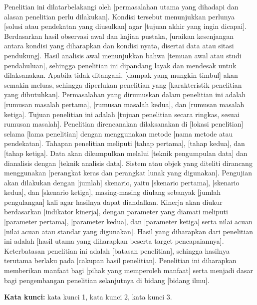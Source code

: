 \begin{abstrak}
Penelitian ini dilatarbelakangi oleh [permasalahan utama yang dihadapi dan alasan penelitian perlu dilakukan]. Kondisi tersebut menunjukkan perlunya [solusi atau pendekatan yang diusulkan] agar [tujuan akhir yang ingin dicapai]. Berdasarkan hasil observasi awal dan kajian pustaka, [uraikan kesenjangan antara kondisi yang diharapkan dan kondisi nyata, disertai data atau sitasi pendukung]. Hasil analisis awal menunjukkan bahwa [temuan awal atau studi pendahuluan], sehingga penelitian ini dipandang layak dan mendesak untuk dilaksanakan. Apabila tidak ditangani, [dampak yang mungkin timbul] akan semakin meluas, sehingga diperlukan penelitian yang [karakteristik penelitian yang dibutuhkan]. Permasalahan yang dirumuskan dalam penelitian ini adalah [rumusan masalah pertama], [rumusan masalah kedua], dan [rumusan masalah ketiga]. Tujuan penelitian ini adalah [tujuan penelitian secara ringkas, sesuai rumusan masalah]. Penelitian direncanakan dilaksanakan di [lokasi penelitian] selama [lama penelitian] dengan menggunakan metode [nama metode atau pendekatan]. Tahapan penelitian meliputi [tahap pertama], [tahap kedua], dan [tahap ketiga]. Data akan dikumpulkan melalui [teknik pengumpulan data] dan dianalisis dengan [teknik analisis data]. Sistem atau objek yang diteliti dirancang menggunakan [perangkat keras dan perangkat lunak yang digunakan]. Pengujian akan dilakukan dengan [jumlah] skenario, yaitu [skenario pertama], [skenario kedua], dan [skenario ketiga], masing-masing diulang sebanyak [jumlah pengulangan] kali agar hasilnya dapat diandalkan. Kinerja akan diukur berdasarkan [indikator kinerja], dengan parameter yang diamati meliputi [parameter pertama], [parameter kedua], dan [parameter ketiga] serta nilai acuan [nilai acuan atau standar yang digunakan]. Hasil yang diharapkan dari penelitian ini adalah [hasil utama yang diharapkan beserta target pencapaiannya]. Keterbatasan penelitian ini adalah [batasan penelitian], sehingga hasilnya terutama berlaku pada [cakupan hasil penelitian]. Penelitian ini diharapkan memberikan manfaat bagi [pihak yang memperoleh manfaat] serta menjadi dasar bagi pengembangan penelitian selanjutnya di bidang [bidang ilmu].

\textbf{Kata kunci:} kata kunci 1, kata kunci 2, kata kunci 3.
\end{abstrak}

